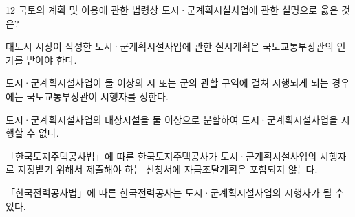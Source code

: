 \begin{question}{12}
국토의 계획 및 이용에 관한 법령상 도시·군계획시설사업에 관한 설명으로 옳은 것은?
\begin{choices}
  \item 대도시 시장이 작성한 도시·군계획시설사업에 관한 실시계획은 국토교통부장관의 인가를 받아야 한다.
  \item 도시·군계획시설사업이 둘 이상의 시 또는 군의 관할 구역에 걸쳐 시행되게 되는 경우에는 국토교통부장관이 시행자를 정한다.
  \item 도시·군계획시설사업의 대상시설을 둘 이상으로 분할하여 도시·군계획시설사업을 시행할 수 없다.
  \item 「한국토지주택공사법」에 따른 한국토지주택공사가 도시·군계획시설사업의 시행자로 지정받기 위해서 제출해야 하는 신청서에 자금조달계획은 포함되지 않는다.
  \item 「한국전력공사법」에 따른 한국전력공사는 도시·군계획시설사업의 시행자가 될 수 있다.
\end{choices}
\end{question}
